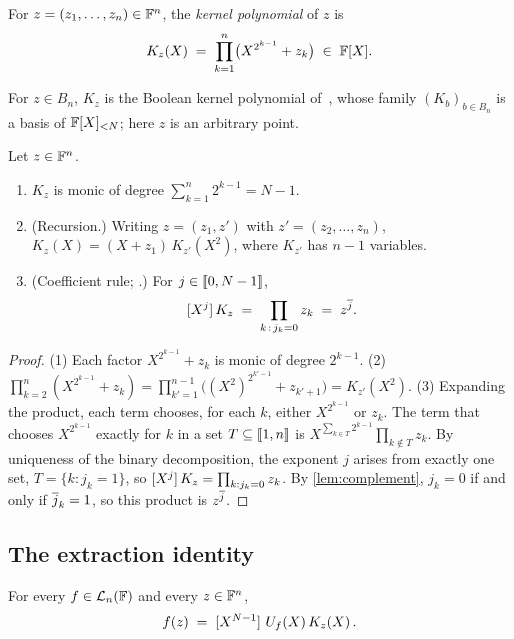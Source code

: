 \begin{definition}\label{def:kernel}
For $z = (z_1,\dots,z_n) \in \mathbb{F}^n$, the \emph{kernel polynomial} of $z$ is
\[
  K_z(X) \;=\; \prod_{k=1}^{n} \bigl(X^{2^{k-1}} + z_k\bigr) \;\in\; \mathbb{F}[X].
\]
\end{definition}

For $z \in B_n$, $K_z$ is the Boolean kernel polynomial of~\cite[Def.~4.1]{Mkh26}, whose family $(K_b)_{b \in B_n}$ is a basis of $\mathbb{F}[X]_{<N}$; here $z$ is an arbitrary point.

\begin{lemma}\label{lem:kernel-basic}
Let $z \in \mathbb{F}^n$.
\begin{enumerate}
  \item $K_z$ is monic of degree $\sum_{k=1}^n 2^{k-1} = N - 1$.
  \item (Recursion.) Writing $z = (z_1, z')$ with $z' = (z_2,\dots,z_n)$, $K_z(X) = (X + z_1)\, K_{z'}(X^2)$, where $K_{z'}$ has $n-1$ variables.
  \item (Coefficient rule; {\cite[Lemma~4.3]{Mkh26}}.) For $j \in \llbracket 0, N-1 \rrbracket$,
  \[
    [X^{j}]\,K_z \;=\; \prod_{k \,:\, j_k = 0} z_k \;=\; z^{\overline{j}} .
  \]
\end{enumerate}
\end{lemma}

\begin{proof}
(1) Each factor $X^{2^{k-1}} + z_k$ is monic of degree $2^{k-1}$.
(2) $\prod_{k=2}^{n} (X^{2^{k-1}} + z_k) = \prod_{k'=1}^{n-1} \bigl((X^2)^{2^{k'-1}} + z_{k'+1}\bigr) = K_{z'}(X^2)$.
(3) Expanding the product, each term chooses, for each $k$, either $X^{2^{k-1}}$ or $z_k$. The term that chooses $X^{2^{k-1}}$ exactly for $k$ in a set $T \subseteq \llbracket 1, n \rrbracket$ is $X^{\sum_{k \in T} 2^{k-1}} \prod_{k \notin T} z_k$. By uniqueness of the binary decomposition, the exponent $j$ arises from exactly one set, $T = \{k : j_k = 1\}$, so $[X^{j}]\,K_z = \prod_{k : j_k = 0} z_k$. By \cref{lem:complement}, $j_k = 0$ if and only if $\overline{j}_k = 1$, so this product is $z^{\overline{j}}$.
\end{proof}

\subsection{The extraction identity}\label{sec:kernel:extraction}

\begin{theorem}\label{thm:extraction}
For every $f \in \mathcal{L}_n(\mathbb{F})$ and every $z \in \mathbb{F}^n$,
\[
  f(z) \;=\; [X^{N-1}]\,\,U_f(X)\, K_z(X)\,.
\]
\end{theorem}

